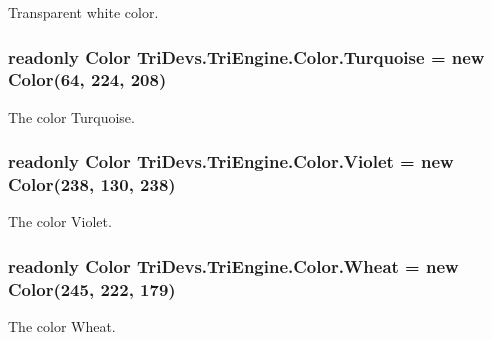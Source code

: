 Transparent white color. 

\hypertarget{struct_tri_devs_1_1_tri_engine_1_1_color_a354499271455e7bec9795153b805bbc9}{
\subsubsection[{Turquoise}]{\setlength{\rightskip}{0pt plus 5cm}readonly {\bf Color} Tri\-Devs.\-Tri\-Engine.\-Color.\-Turquoise = new {\bf Color}(64, 224, 208)\hspace{0.3cm}{\ttfamily [static]}}}\label{struct_tri_devs_1_1_tri_engine_1_1_color_a354499271455e7bec9795153b805bbc9}


The color Turquoise. 

\hypertarget{struct_tri_devs_1_1_tri_engine_1_1_color_ad6774e5a8fd5956000ba8dd22a404839}{
\subsubsection[{Violet}]{\setlength{\rightskip}{0pt plus 5cm}readonly {\bf Color} Tri\-Devs.\-Tri\-Engine.\-Color.\-Violet = new {\bf Color}(238, 130, 238)\hspace{0.3cm}{\ttfamily [static]}}}\label{struct_tri_devs_1_1_tri_engine_1_1_color_ad6774e5a8fd5956000ba8dd22a404839}


The color Violet. 

\hypertarget{struct_tri_devs_1_1_tri_engine_1_1_color_a84e93e4b37ce1a06dcd388e826f0e53c}{
\subsubsection[{Wheat}]{\setlength{\rightskip}{0pt plus 5cm}readonly {\bf Color} Tri\-Devs.\-Tri\-Engine.\-Color.\-Wheat = new {\bf Color}(245, 222, 179)\hspace{0.3cm}{\ttfamily [static]}}}\label{struct_tri_devs_1_1_tri_engine_1_1_color_a84e93e4b37ce1a06dcd388e826f0e53c}


The color Wheat. 

